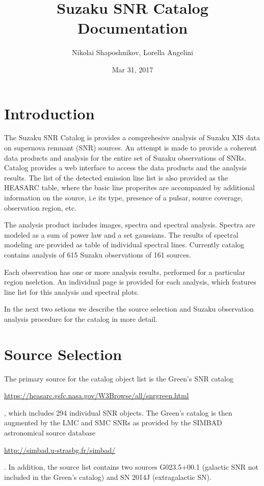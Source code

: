\documentclass[letterpaper,10pt,english]{sphinxmanual}
\title{Suzaku SNR Catalog Documentation}
\date{Mar 31, 2017}
\author{Nikolai Shaposhnikov, Lorella Angelini}
\begin{document}
\maketitle
\sphinxtableofcontents
{}\label{\detokenize{index::doc}}



\chapter{Introduction}
\label{\detokenize{intro:welcome-to-suzaku-snr-catalog-s-documentation}}\label{\detokenize{intro:introduction}}\label{\detokenize{intro::doc}}
The Suzaku SNR Catalog is provides a comprehesive analysis of Suzaku XIS data on
supernova remnant (SNR) sources. An attempt is made to provide a coherent data products
and analysis for the entire set of Suzaku observations of SNRs. Catalog provides
a web interface to access the data products and the analysis results. The list of
the detected emission line list is also provided as the HEASARC table, where the
basic line properites are accompanied by additional information on the source, i.e its
type, presence of a pulsar, source coverage, observation region, etc.

The analysis product includes images, spectra and spectral analysis.
Spectra are modeled as a sum of power law and a set gaussians.
The results of spectral modeling are provided as table of individual spectral lines.
Currently catalog contains analysis of 615 Suzaku observations of 161 sources.

Each observation has one or more analysis results, performed
for a particular region nselction.  An individual page is provided
for each analysis, which features line list for this analysis
and spectral plots.

In the next two setions we describe the source selection and Suzaku observation
analysis procedure for the catalog
in more detail.


\chapter{Source Selection}
\label{\detokenize{sources:source-selection}}\label{\detokenize{sources::doc}}
The primary source for the catalog object list is  the Green's SNR catalog %
\begin{footnote}[1]\sphinxAtStartFootnote
\url{https://heasarc.gsfc.nasa.gov/W3Browse/all/snrgreen.html}
%
\end{footnote},
which includes 294 individual SNR objects. The Green's catalog
is then  augmented by the LMC and SMC SNRs as provided by the SIMBAD astronomical
source database %
\begin{footnote}[2]\sphinxAtStartFootnote
\url{http://simbad.u-strasbg.fr/simbad/}
%
\end{footnote}. In addition, the source list contains two sources G023.5+00.1
(galactic SNR not included in the Green's catalog) and SN 2014J (extragalactic SN).
\end{document}

